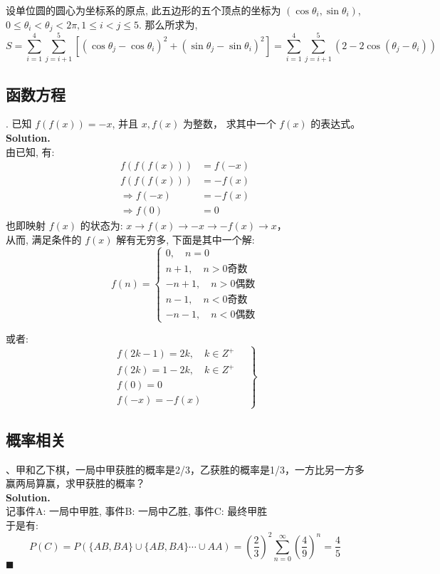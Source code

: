 \documentclass[UTF8]{article}
\begin{document}
\noindent 设单位圆的圆心为坐标系的原点, 此五边形的五个顶点的坐标为 $(\cos\theta_i,\sin\theta_i)$, $0\le \theta_i < \theta_j < 2\pi, 1 \le i < j \le 5$. 那么所求为,
 $$ S = \sum_{i=1}^{4}\sum_{j=i+1}^{5}[(\cos\theta_j-\cos\theta_i)^2+(\sin\theta_j-\sin\theta_i)^2] = \sum_{i=1}^{4}\sum_{j=i+1}^{5}(2-2\cos(\theta_j-\theta_i))$$

\subsection{函数方程}
. 已知 $f(f(x)) = -x$, 并且 $x, f(x) $ 为整数， 求其中一个 $f(x)$ 的表达式。 \\
\noindent \textbf{Solution.} \\
由已知, 有: 
\begin{align*}
f(f(f(x))) &= f(-x) \\
f(f(f(x))) &= -f(x) \\
\Longrightarrow  f(-x) & = -f(x) \\
\Longrightarrow f(0) & = 0
\end{align*}
也即映射 $f(x)$ 的状态为: $ x\rightarrow f(x)\rightarrow  -x\rightarrow -f(x)\rightarrow x$， \\
从而, 满足条件的 $f(x)$ 解有无穷多, 下面是其中一个解:
$$
f(n) = \left\{ 
\begin{aligned}
0,  \quad n=0 \\
n+1, \quad n>0\text{奇数}\\
-n+1,  \quad n>0\text{偶数}\\
n-1,  \quad n<0\text{奇数}\\
-n-1,  \quad n<0\text{偶数}
\end{aligned}
\right.
$$

或者: 
$$
\left. 
\begin{aligned}
f(2k-1) = 2k , \quad k \in Z^+ \\
f(2k) = 1-2k , \quad k \in Z^+ \\
f(0) = 0 \\
f(-x) = - f(x) 
\end{aligned}
\quad \right\}
$$

\subsection{概率相关}
、甲和乙下棋，一局中甲获胜的概率是2/3，乙获胜的概率是1/3，一方比另一方多赢两局算赢，求甲获胜的概率？ \\
\noindent \textbf{Solution.} \\
记事件A: 一局中甲胜, 事件B: 一局中乙胜, 事件C: 最终甲胜\\
于是有: 
$$P(C) =P(\{AB,BA\} \cup \{AB,BA\} \cdots \cup AA) = (\frac{2}{3})^2 \sum_{n=0}^{\infty}(\frac{4}{9})^n = \frac{4}{5}$$
$\blacksquare$
\end{document}
